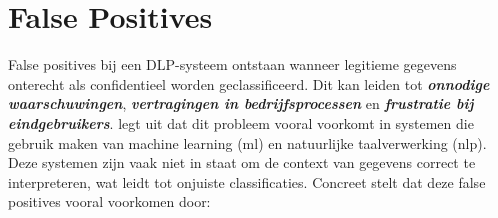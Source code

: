 

\section{False Positives}
\label{sec:false-positives-literatuurstudie}

False positives bij een DLP-systeem ontstaan wanneer legitieme gegevens onterecht als confidentieel worden geclassificeerd.
Dit kan leiden tot  \textit{\textbf{onnodige waarschuwingen}}, \textit{\textbf{vertragingen in bedrijfsprocessen}} en \textit{\textbf{frustratie bij eindgebruikers}}. 
\textcite{Lukas2023} legt uit dat dit probleem vooral voorkomt in systemen die gebruik maken van machine learning (\gls{ml}) en natuurlijke taalverwerking (\gls{nlp}). 
Deze systemen zijn vaak niet in staat om de context van gegevens correct te interpreteren, wat leidt tot onjuiste classificaties.
Concreet stelt \textcite{Lukas2023} dat deze false positives vooral voorkomen door:



